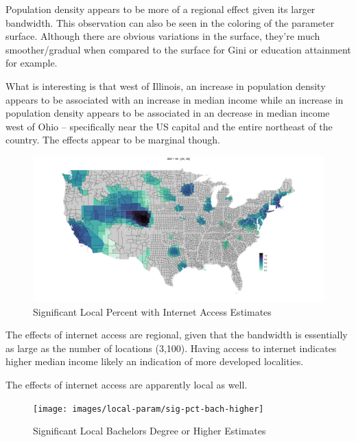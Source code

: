 \documentclass[
]{article}
\begin{document}
Population density appears to be more of a regional effect given its
larger bandwidth. This observation can also be seen in the coloring of
the parameter surface. Although there are obvious variations in the
surface, they're much smoother/gradual when compared to the surface for
Gini or education attainment for example.

What is interesting is that west of Illinois, an increase in population
density appears to be associated with an increase in median income while
an increase in population density appears to be associated in an
decrease in median income west of Ohio -- specifically near the US
capital and the entire northeast of the country. The effects appear to
be marginal though.

\begin{figure}[H]

{\centering \includegraphics[width=1\linewidth]{images/local-param/sig-internet-access} 

}

\caption{Significant Local Percent with Internet Access Estimates}\label{fig:unnamed-chunk-15}
\end{figure}

The effects of internet access are regional, given that the bandwidth is
essentially as large as the number of locations (3,100). Having access
to internet indicates higher median income likely an indication of more
developed localities.

The effects of internet access are apparently local as well.

\begin{figure}[H]

{\centering \texttt{[image: images/local-param/sig-pct-bach-higher]} 

}

\caption{Significant Local Bachelors Degree or Higher Estimates}\label{fig:unnamed-chunk-16}
\end{figure}
\end{document}
